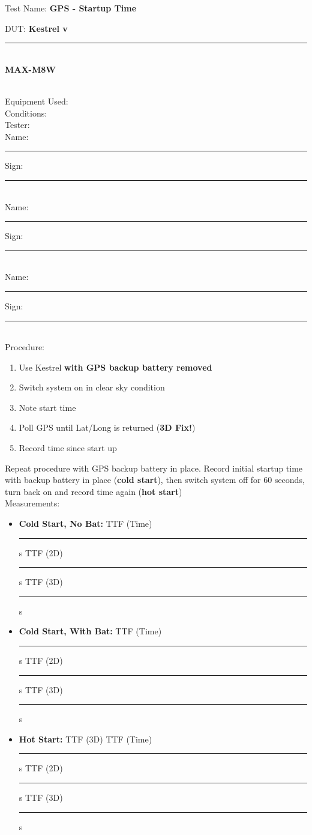 \pagebreak
\noindent
{\Huge Test Name:  \textbf{GPS - Startup Time}}\\[20pt]
{\Large DUT: \textbf{Kestrel v}\rule{1cm}{0.15mm}\\\textbf{MAX-M8W}} \\[10pt]
{\Large Equipment Used: }\\[40pt]
{\Large Conditions: }\\[40pt]
{\Large Tester: }\\[10pt]
Name: \rule{4cm}{0.15mm} \hfill Sign: \rule{4cm}{0.15mm}\\[5pt]
Name: \rule{4cm}{0.15mm} \hfill Sign: \rule{4cm}{0.15mm}\\[5pt]
Name: \rule{4cm}{0.15mm} \hfill Sign: \rule{4cm}{0.15mm}\\[15pt]
{\Large Procedure: }\\
\begin{enumerate}
\item Use Kestrel \textbf{with GPS backup battery removed}
\item Switch system on in clear sky condition
\item Note start time
\item Poll GPS until Lat/Long is returned (\textbf{3D Fix!})
\item Record time since start up
\end{enumerate}
Repeat procedure with GPS backup battery in place. Record initial startup time with backup battery in place (\textbf{cold start}), then switch system off for 60 seconds, turn back on and record time again (\textbf{hot start})
\\[5pt]
{\Large Measurements: }\\
\begin{itemize}
\item \textbf{Cold Start, No Bat:} TTF (Time) \rule{2cm}{0.15mm} s \hspace{1cm}  TTF (2D) \rule{2cm}{0.15mm} s \hspace{1cm}  TTF (3D) \rule{2cm}{0.15mm} s
\item \textbf{Cold Start, With Bat:} TTF (Time) \rule{2cm}{0.15mm} s \hspace{1cm}  TTF (2D) \rule{2cm}{0.15mm} s \hspace{1cm}  TTF (3D) \rule{2cm}{0.15mm} s
\item \textbf{Hot Start:} TTF (3D) TTF (Time) \rule{2cm}{0.15mm} s \hspace{1cm}  TTF (2D) \rule{2cm}{0.15mm} s \hspace{1cm}  TTF (3D) \rule{2cm}{0.15mm} s
\end{itemize}

